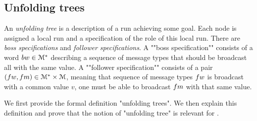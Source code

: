 %	


\subsection{Unfolding trees}
\label{sec:decidability-tree-unfoldings}

An \emph{unfolding tree} is a description of a run achieving some goal. Each node is assigned a local run and a specification of the role of this local run. There are \emph{boss specifications} and \emph{follower specifications}. A ""boss specification"" consists of a word $\bossspec \in \messages^*$ describing a sequence of message types that should be broadcast all with the same value. A ""follower specification"" consists of a pair $(\followwordspec, \followmessagespec) \in \messages^*\times \messages$, meaning that sequence of message types $\followwordspec$ is broadcast with a common value $v$, one must be able to broadcast $\followmessagespec$ with that same value. 

We first provide the formal definition "unfolding trees". We then explain this definition and prove that the notion of "unfolding tree" is relevant for \COVER. 


